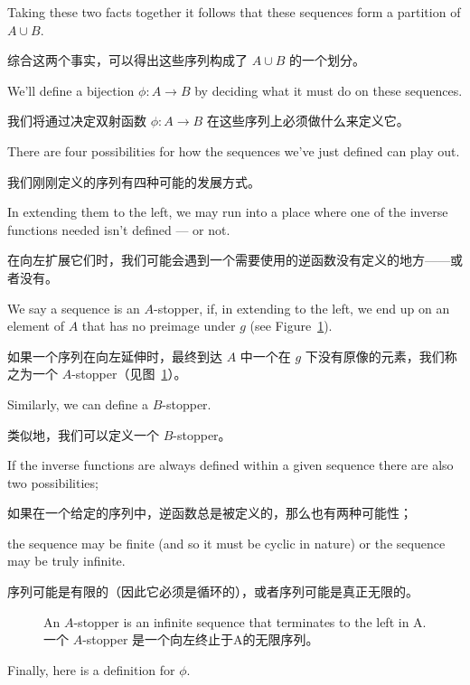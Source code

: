 Taking these two facts together it follows that these sequences
form a partition of $A \cup B$.

综合这两个事实，可以得出这些序列构成了 $A \cup B$ 的一个划分。

We'll define a bijection
$\phi : A \longrightarrow B$ by deciding what it must do on these
sequences.

我们将通过决定双射函数 $\phi : A \longrightarrow B$ 在这些序列上必须做什么来定义它。

There are four possibilities for how the sequences we've
just defined can play out.

我们刚刚定义的序列有四种可能的发展方式。

In extending them to the left, we may run
into a place where one of the inverse functions needed isn't
defined --- or not.

在向左扩展它们时，我们可能会遇到一个需要使用的逆函数没有定义的地方——或者没有。

We say a sequence is an
$A$-stopper, if, in extending to the left, we end
up on an element of $A$ that has
no preimage under $g$ (see Figure~\ref{fig:A-stopper}).

如果一个序列在向左延伸时，最终到达 $A$ 中一个在 $g$ 下没有原像的元素，我们称之为一个 $A$-stopper（见图~\ref{fig:A-stopper}）。

Similarly,
we can define a $B$-stopper.

类似地，我们可以定义一个 $B$-stopper。

If the inverse functions are always defined within a given sequence there are
also two possibilities;

如果在一个给定的序列中，逆函数总是被定义的，那么也有两种可能性；

the sequence may be finite (and so it must be cyclic in
nature) or the sequence may be truly infinite.

序列可能是有限的（因此它必须是循环的），或者序列可能是真正无限的。

\begin{figure}[!hbtp]
    \begin{center}
        
    \end{center}
    \caption[An \emph{A}-stopper in the proof of C-B-S.C-B-S证明中的一个\emph{A}-stopper。]{An $A$-stopper
        is an infinite sequence that terminates to the left in A.一个 $A$-stopper 是一个向左终止于A的无限序列。}
    \label{fig:A-stopper}
\end{figure}


Finally, here is a definition for $\phi$.

